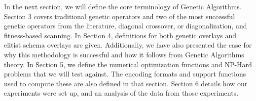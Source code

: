 In the next section, we will define the core terminology of Genetic Algorithms.   Section 3 covers traditional genetic operators and two of the most successful genetic operators from the literature, diagonal crossover, or diagonalization, and fitness-based scanning. In Section 4, definitions for both genetic overlays and elitist schema overlays are given. Additionally, we have also presented the case for why this methodology is successful and how it follows from Genetic Algorithms theory. In Section 5, we define the numerical optimization functions and NP-Hard problems that we will test against. The encoding formats and support functions used to compute these are also defined in that section. Section 6 details how our experiments were set up, and an analysis of the data from those experiments.